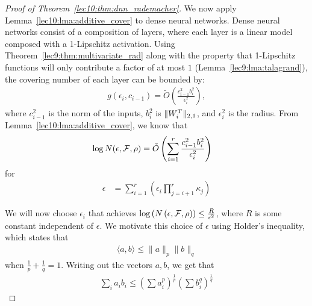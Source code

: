 \begin{proof}[Proof of Theorem~\ref{lec10:thm:dnn_rademacher}]
We now apply Lemma~\ref{lec10:lma:additive_cover} to dense neural networks. Dense neural networks consist of a composition of layers, where each layer is a linear model composed with a 1-Lipschitz activation. Using Theorem~\ref{lec9:thm:multivariate_rad} along with the property that 1-Lipschitz functions will only contribute a factor of at most $1$ (Lemma~\ref{lec9:lma:talagrand}), the covering number of each layer can be bounded by:
\begin{align}
    g\left(\epsilon_i, c_{i-1}\right) = \tilde{O}\left(\frac{c_{i-1}^2b_i^2}{\epsilon_i^2}\right),
\end{align}
where $c_{i-1}^2$ is the norm of the inputs, $b_i^2$ is $\|W_i^T\|_{2,1}$, and $\epsilon_i^2$ is the radius. From Lemma~\ref{lec10:lma:additive_cover}, we know that 
\begin{align}
    \log N(\epsilon, \mathcal F, \rho) &= \tilde{O}\left(\sum_{i=1}^{r}\frac{c_{i-1}^2b_i^2}{\epsilon_i^2}\right) 
\end{align}
for
\begin{align}
    \epsilon &= \sum_{i=1}^{r} \left(\epsilon_i \prod_{j=i+1}^{r}\kappa_j\right)
\end{align}

We will now choose $\epsilon_i$ that achieves $\log\left(N\left(\epsilon, \mathcal F, \rho\right)\right) \leq \frac{R}{\epsilon^2}$, where $R$ is some constant independent of $\epsilon$. We motivate this choice of $\epsilon$ using Holder's inequality, which states that
\begin{align}
    \langle a,  b \rangle \leq \|a\|_p \|b\|_q
\end{align}
when $\frac{1}{p} + \frac{1}{q} = 1$. Writing out the vectors $a, b$, we get that 
\begin{align}
    \sum_{i}a_ib_i \leq \left(\sum a_i^p\right)^{\frac{1}{p}}\left(\sum b_i^q\right)^{\frac{1}{q}}
\end{align}


\end{proof}
